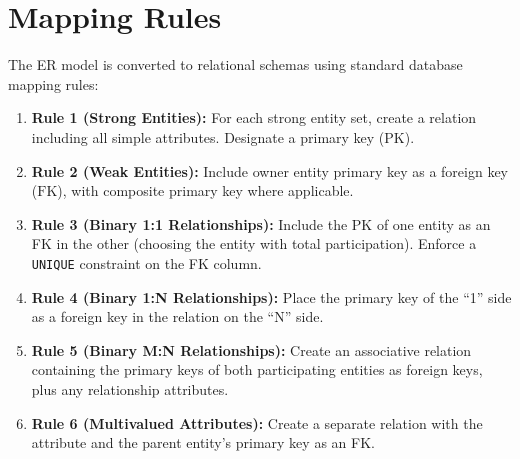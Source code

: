\documentclass[12pt,a4paper]{report}
\DeclareRobustCommand{\_}{\textunderscore\allowbreak}
\begin{document}
\section{Mapping Rules}
The ER model is converted to relational schemas using standard database mapping rules:
\begin{enumerate}
    \item \textbf{Rule 1 (Strong Entities):} For each strong entity set, create a relation including all simple attributes. Designate a primary key ($\text{PK}$).
    \item \textbf{Rule 2 (Weak Entities):} Include owner entity primary key as a foreign key ($\text{FK}$), with composite primary key where applicable.
    \item \textbf{Rule 3 (Binary 1:1 Relationships):} Include the PK of one entity as an FK in the other (choosing the entity with total participation). Enforce a \texttt{UNIQUE} constraint on the FK column.
    \item \textbf{Rule 4 (Binary 1:N Relationships):} Place the primary key of the ``1'' side as a foreign key in the relation on the ``N'' side.
    \item \textbf{Rule 5 (Binary M:N Relationships):} Create an associative relation containing the primary keys of both participating entities as foreign keys, plus any relationship attributes.
    \item \textbf{Rule 6 (Multivalued Attributes):} Create a separate relation with the attribute and the parent entity's primary key as an FK.
\end{enumerate}
\end{document}
